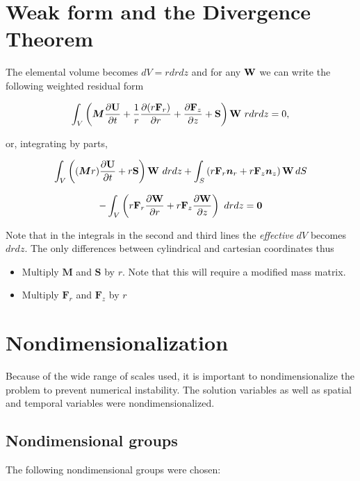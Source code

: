 \documentclass[12pt, a4paper]{report}
\begin{document}
\section{Weak form and the Divergence Theorem}
The elemental volume becomes $dV = r dr dz$ and for any ${\bf W}$ we can write the following weighted residual form

\begin{center}
\[\begin{array}{c} \displaystyle
\int_V \left({\bm M} \frac{\partial {\bf U}}{\partial t} +  \frac{1}{r} \frac{\partial (r {\bf F}_r)}{\partial r}  + \frac{\partial {\bf F}_z}{\partial z} +   {\bf S}\right) {\bf W} \ r dr dz  = 0 ,
\end{array} \]
\end{center}
or, integrating by parts, 
\begin{center}
\[\begin{array}{c}
\displaystyle \int_V \left(({\bm M} r) \frac{\partial {\bf U}}{\partial t}   +r{\bf S}\right) {\bf W} \ dr  dz  
\displaystyle + \int_S\left(  r {\bf F}_r {\bm n}_r +  r {\bf F}_z {\bm n}_z \right) {\bf W}  \, dS \\[4ex] - \displaystyle \int_V \left(  r {\bf F}_r\frac{\partial {\bf W}}{\partial r}  + r {\bf F}_z\frac{\partial {\bf W}}{\partial z} \right) \ dr  dz  = {\bf 0}
\end{array}
\]
\end{center}

Note that in the integrals in the second and third lines the {\em effective} $dV$ becomes $dr dz$. The only differences between cylindrical and cartesian coordinates thus

\begin{itemize}
\item Multiply $\bm M$ and $\bm S$ by $r$. Note that this will require a modified mass matrix.
\item Multiply ${\bm F}_r$ and ${\bm F}_z$ by $r$

\end{itemize}

\section{Nondimensionalization}
\noindent
Because of the wide range of scales used, it is important to nondimensionalize the problem to prevent numerical instability. The solution variables as well as spatial and temporal variables were nondimensionalized.

\subsection{Nondimensional groups}
The following nondimensional groups were chosen:
\end{document}
